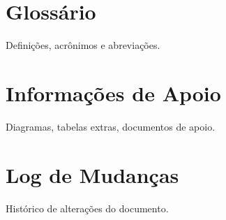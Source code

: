 \appendix

\chapter{Glossário}
Definições, acrônimos e abreviações.  

\chapter{Informações de Apoio}
Diagramas, tabelas extras, documentos de apoio.  

\chapter{Log de Mudanças}
Histórico de alterações do documento.  